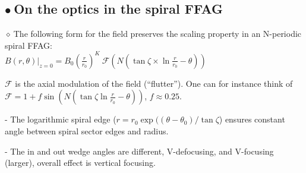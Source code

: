 \documentclass[12pt]{article}
\newcommand{\nib}{\noindent \ensuremath{\bullet~}}
\newcommand{\nid}{\noindent \ensuremath{\diamond~}}
\newcommand{\blue}{\color{blue}}
\begin{document}
\begin{minipage}[b]{1.\linewidth}

\subsection*{\LARGE \nib  On the optics  in the spiral FFAG }

 \sf 
\fontsize{19}{24} \selectfont

\nid The following form for the field preserves the scaling property in an N-periodic  spiral FFAG: \\
{\LARGE \blue  $   B(r, \theta)|_{z=0} = B_0 \left( \frac{r}{r_0} \right)^K \ 
\mathcal{F}\left(N( \tan \zeta \times \ln \frac{r}{r_0} - \theta) \right) $} \\
\begin{minipage}[b]{.7\linewidth}

\fontsize{18}{23} \selectfont


$\mathcal{F}$ is the axial modulation of the field (``flutter''). One can for instance think of \\
{\blue $\mathcal{F}=1+f\sin\left( N(\tan \zeta \ln \frac{r}{r_0} -  \theta) \right)$, $f\approx 0.25$. }

\medskip
- The logarithmic spiral edge { \blue ($r = r_0 \exp((\theta-\theta_0)/\tan \zeta$) }
 ensures constant  angle between  spiral sector edges and radius.

- The in and out wedge angles  are different,  V-defocusing, 
and V-focusing (larger), overall effect is vertical focusing.



\medskip


\end{minipage}
\end{minipage}
\end{document}
